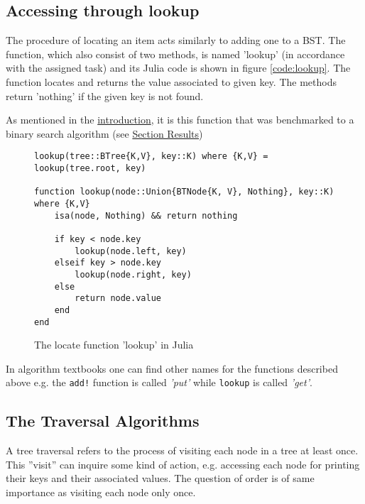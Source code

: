 \documentclass[a4paper, 11pt]{article}
\begin{document}
    \clearpage
    \subsection*{Accessing through lookup}
    The procedure of locating an item acts similarly to adding one to
    a BST. 
    The function, which also consist of two methods, is named 'lookup' (in
    accordance with the assigned task) and its Julia code is shown in figure
    \autoref{code:lookup}. The function locates and returns the value associated
    to given key. The methods return 'nothing' if the given key is not found. 
    
    As mentioned in the \hyperref[sec:introduction]{introduction}, 
    it is this function that was benchmarked to 
    a binary search algorithm (see \hyperref[sec:results]{Section Results})

    \begin{figure}[H]
        \centering
    \begin{verbatim}
lookup(tree::BTree{K,V}, key::K) where {K,V} = lookup(tree.root, key)

function lookup(node::Union{BTNode{K, V}, Nothing}, key::K) where {K,V}
    isa(node, Nothing) && return nothing

    if key < node.key
        lookup(node.left, key)
    elseif key > node.key
        lookup(node.right, key)
    else
        return node.value
    end
end
    \end{verbatim}
    \caption{The locate function 'lookup' in Julia}
    \label{code:lookup}
    \end{figure}
    In algorithm textbooks one can find other names for the functions described above 
    e.g. the \texttt{add!} function is called \emph{'put'} while 
    \texttt{lookup} is called \emph{'get'}.

    \subsection*{The Traversal Algorithms}
    \label{sec:treetraversal}
    
    A tree traversal refers to the process of visiting each node in a tree at least once. 
    This ''visit'' can inquire some kind of action, 
    e.g. accessing each node for printing their keys and their associated values. 
    The question of order is of same importance as visiting each node only once. 
    
\end{document}
